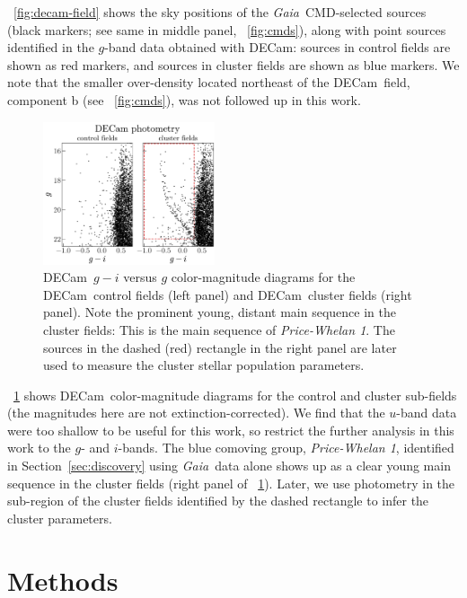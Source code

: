 \documentclass[twocolumn]{aastex62}
\newcommand{\gaia}{\textsl{Gaia}}
\newcommand{\decam}{DECam}
\newcommand{\sectionname}{Section}
\newcommand{\clustername}{\textsl{Price-Whelan 1}}
\begin{document}
\figurename~\ref{fig:decam-field} shows the sky positions of the \gaia\ CMD-selected sources (black markers; see same in middle panel, \figurename~\ref{fig:cmds}), along with point sources identified in the $g$-band data obtained with \decam: sources in control fields are shown as red markers, and sources in cluster fields are shown as blue markers.
We note that the smaller over-density located northeast of the \decam\ field, component b (see \figurename~\ref{fig:cmds}), was not followed up in this work.

\begin{figure}[t!]
\centering
\includegraphics[width=0.45\textwidth]{figures/DECam-cmd.pdf}
\caption{\decam\ $g-i$ versus $g$ color-magnitude diagrams for the \decam\ control fields (left panel) and \decam\ cluster fields (right panel).
Note the prominent young, distant main sequence in the cluster fields: This is the main sequence of \clustername.
The sources in the dashed (red) rectangle in the right panel are later used to measure the cluster stellar population parameters.
}
\label{fig:decam-cmd}
\end{figure}

\figurename~\ref{fig:decam-cmd} shows \decam\ color-magnitude diagrams for the control and cluster sub-fields (the magnitudes here are not extinction-corrected).
We find that the $u$-band data were too shallow to be useful for this work, so restrict the further analysis in this work to the $g$- and $i$-bands.
The blue comoving group, \clustername, identified in \sectionname~\ref{sec:discovery} using \gaia\ data alone shows up as a clear young main sequence in the cluster fields (right panel of \figurename~\ref{fig:decam-cmd}).
Later, we use photometry in the sub-region of the cluster fields identified by the dashed rectangle to infer the cluster parameters.


\section{Methods} \label{sec:methods}
\end{document}
